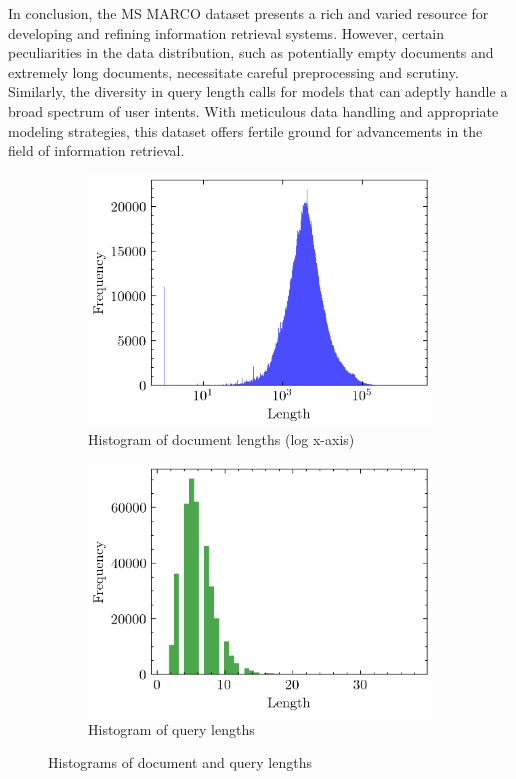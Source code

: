 \documentclass[11pt,a4paper]{article}
\begin{document}
In conclusion, the MS MARCO dataset presents a rich and varied
resource for developing and refining information retrieval systems.
However, certain peculiarities in the data distribution, such as
potentially empty documents and extremely long documents, necessitate
careful preprocessing and scrutiny. Similarly, the diversity in query
length calls for models that can adeptly handle a broad spectrum of
user intents. With meticulous data handling and appropriate modeling
strategies, this dataset offers fertile ground for advancements in
the field of information retrieval.
\begin{figure}[ht!]
    \centering
    \begin{subfigure}[b]{0.45\textwidth}
        \includegraphics[width=\textwidth]{media/doc_lengths_histogram_log_x.png}
        \caption{Histogram of document lengths (log x-axis)}
    \end{subfigure}
    \hfill
    \begin{subfigure}[b]{0.45\textwidth}
        \includegraphics[width=\textwidth]{media/query_lengths_histogram.png}
        \caption{Histogram of query lengths}
    \end{subfigure}
    \caption{Histograms of document and query lengths}
\end{figure}
\end{document}
